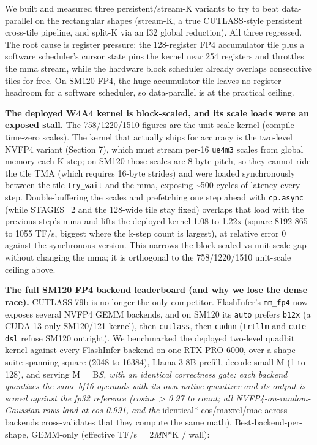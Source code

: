 \documentclass[
]{article}
\begin{document}
We built and measured three persistent/stream-K variants to try to beat
data-parallel on the rectangular shapes (stream-K, a true CUTLASS-style
persistent cross-tile pipeline, and split-K via an f32 global
reduction). All three regressed. The root cause is register pressure:
the 128-register FP4 accumulator tile plus a software scheduler's cursor
state pins the kernel near 254 registers and throttles the mma stream,
while the hardware block scheduler already overlaps consecutive tiles
for free. On SM120 FP4, the huge accumulator tile leaves no register
headroom for a software scheduler, so data-parallel is at the practical
ceiling.

\textbf{The deployed W4A4 kernel is block-scaled, and its scale loads
were an exposed stall.} The 758/1220/1510 figures are the unit-scale
kernel (compile-time-zero scales). The kernel that actually ships for
accuracy is the two-level NVFP4 variant (Section 7), which must stream
per-16 \texttt{ue4m3} scales from global memory each K-step; on SM120
those scales are 8-byte-pitch, so they cannot ride the tile TMA (which
requires 16-byte strides) and were loaded synchronously between the tile
\texttt{try\_wait} and the mma, exposing \textasciitilde500 cycles of
latency every step. Double-buffering the scales and prefetching one step
ahead with \texttt{cp.async} (while STAGES=2 and the 128-wide tile stay
fixed) overlaps that load with the previous step's mma and lifts the
deployed kernel 1.08 to 1.22x (square 8192 865 to 1055 TF/s, biggest
where the k-step count is largest), at relative error 0 against the
synchronous version. This narrows the block-scaled-vs-unit-scale gap
without changing the mma; it is orthogonal to the 758/1220/1510
unit-scale ceiling above.

\textbf{The full SM120 FP4 backend leaderboard (and why we lose the
dense race).} CUTLASS 79b is no longer the only competitor. FlashInfer's
\texttt{mm\_fp4} now exposes several NVFP4 GEMM backends, and on SM120
its \texttt{auto} prefers \texttt{b12x} (a CUDA-13-only SM120/121
kernel), then \texttt{cutlass}, then \texttt{cudnn} (\texttt{trtllm} and
\texttt{cute-dsl} refuse SM120 outright). We benchmarked the deployed
two-level quadbit kernel against every FlashInfer backend on one RTX PRO
6000, over a shape suite spanning square (2048 to 16384), Llama-3-8B
prefill, decode small-M (1 to 128), and serving M = B\emph{S, with an
identical correctness gate: each backend quantizes the same bf16
operands with its own native quantizer and its output is scored against
the fp32 reference (cosine \textgreater{} 0.97 to count; all
NVFP4-on-random-Gaussian rows land at cos 0.991, and the }identical*
cos/maxrel/mae across backends cross-validates that they compute the
same math). Best-backend-per-shape, GEMM-only (effective TF/s =
2\emph{M}N*K / wall):
\end{document}
